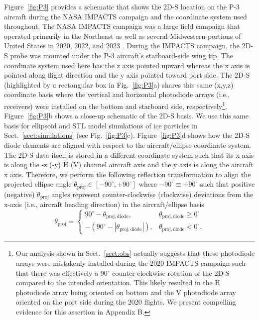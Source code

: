 \documentclass[amt, manuscript]{copernicus}
\begin{document}
Figure~\ref{fig:P3} provides a schematic that shows the 2D-S location on the P-3 aircraft during the NASA IMPACTS campaign and the coordinate system used throughout. The NASA IMPACTS campaign was a large field campaign that operated primarily in the Northeast as well as several Midwestern portions of United States in 2020, 2022, and 2023 \citep{McMurdie2019,McMurdie2022}. During the IMPACTS campaign, the 2D-S probe was mounted under the P-3 aircraft's starboard-side wing tip. The coordinate system used here has the z axis pointed upward whereas the x axis is pointed along flight direction and the y axis pointed toward port side. The 2D-S (highlighted by a rectangular box in Fig.~\ref{fig:P3}a) shares this same (x,y,z) coordinate basis where the vertical and horizontal photodiode arrays (i.e., receivers) were installed on the bottom and starboard side, respectively\footnote{Our analysis shown in Sect.~\ref{sect:obs} actually suggests that these photodiode arrays were mistakenly installed during the 2020 IMPACTS campaign such that there was effectively a 90$^{\circ}$ counter-clockwise rotation of the 2D-S compared to the intended orientation. This likely resulted in the H photodiode array being oriented on bottom and the V photodiode array oriented on the port side during the 2020 flights. We present compelling evidence for this assertion in Appendix B.}. Figure~\ref{fig:P3}b shows a close-up schematic of the 2D-S basis. We use this same basis for ellipsoid and STL model simulations of ice particles in Sect.~\ref{sect:simulations} (see Fig.~\ref{fig:P3}c). Figure~\ref{fig:P3}d shows how the 2D-S diode elements are aligned with respect to the aircraft/ellipse coordinate system. The 2D-S data itself is stored in a different coordinate system such that its x axis is along the -z (-y) H (V) channel aircraft axis and the y axis is along the aircraft x axis. Therefore, we perform the following reflection transformation to align the projected ellipse angle $\theta_{\mathrm{proj}} \in [-90^{\circ},+90^{\circ}]$ where $-90^{\circ} \equiv +90^{\circ}$ such that positive (negative) $\theta_{\mathrm{proj}}$ angles represent counter-clockwise (clockwise) deviations from the x-axis (i.e., aircraft heading direction) in the aircraft/ellipse basis   
\begin{equation}
\theta_{\mathrm{proj}} = 
\begin{cases}
90^{\circ} - \theta_{\mathrm{proj},\mathrm{diode}}, & \theta_{\mathrm{proj},\mathrm{diode}} \geq 0^{\circ}\\
-(90^{\circ} - |\theta_{\mathrm{proj},\mathrm{diode}}|), & \theta_{\mathrm{proj},\mathrm{diode}} < 0^{\circ}.
\end{cases}
\end{equation}
\end{document}
